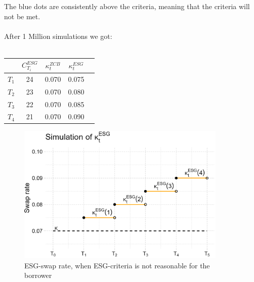 The blue dots are consistently above the criteria, meaning that the criteria will not be met. 
\\~\\ 
After 1 Million simulations we got:
\\~\\
\begin{tabular}{lcccl}
\toprule
           &$C_{T_{i}}^{ESG}$ & $\kappa_{t}^{ZCB}$  & $\kappa_{t}^{ESG}$ \\
\midrule
$T_{1}$ &  24 & 0.070 & 0.075 \\
$T_{2}$ &  23 & 0.070 & 0.080 \\
$T_{3}$ &  22 & 0.070 & 0.085 \\
$T_{4}$ &  21 & 0.070 & 0.090 \\
\bottomrule
\end{tabular}


\begin{figure}[htp]
    \centering
    \includegraphics[width= 10cm]{figures/ESG/kappa_t_ESG_3.png}
    \caption{ESG-swap rate, when ESG-criteria is not reasonable for the borrower}
    \label{fig: ESG_swap_3}
\end{figure}











